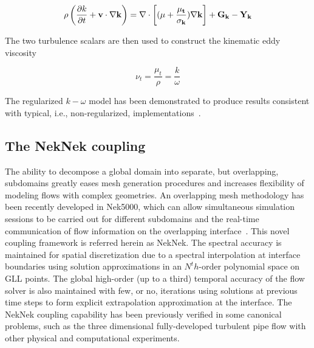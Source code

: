 \begin{equation}
\label{eqn:k_trans}
\rho \left( \frac{\partial k}{\partial t} + \bf{v} \cdot \bf{\nabla}  k \right) =  \bf{\nabla} \cdot \left[ (\mu+\frac{\mu_t}{\sigma_k } ) \bf{\nabla} k \right] + G_k - Y_k
\end{equation}

The two turbulence scalars are then used to construct the kinematic eddy viscosity

\begin{equation}
	\nu_t = \frac{\mu_t}{\rho} = \frac{k}{\omega}
\end{equation}

The regularized $k-\omega$ model has been demonstrated to produce results consistent with typical, i.e., non-regularized, implementations~\citep{Tomboulides2018}.


\subsection{The NekNek coupling}
\label{sec:nek3}

The ability to decompose a global domain into separate, but overlapping, subdomains greatly eases mesh generation procedures and increases flexibility of modeling flows with complex geometries. An overlapping mesh methodology has been recently developed in Nek5000, which can allow simultaneous simulation sessions to be carried out for different subdomains and the real-time communication of flow information on the overlapping interface~\citep{Merrill2016}. This novel coupling framework is referred herein as NekNek. The spectral accuracy is maintained for spatial discretization due to a spectral interpolation at interface boundaries using solution approximations in an $N^th$-order polynomial space on GLL points. The global high-order (up to a third) temporal accuracy of the flow solver is also maintained with few, or no, iterations using solutions at previous time steps to form explicit extrapolation approximation at the interface. The NekNek coupling capability has been previously verified in some canonical problems, such as the three dimensional fully-developed turbulent pipe flow with other physical and computational experiments. 
